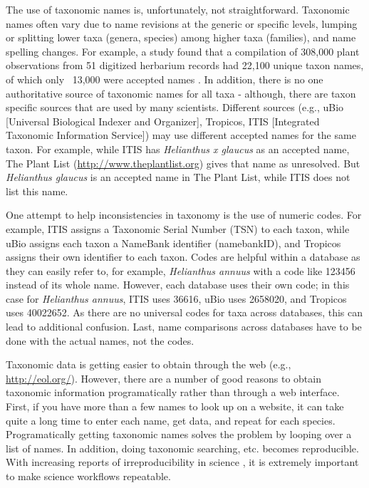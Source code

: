 \begin{sloppypar}
The use of taxonomic names is, unfortunately, not straightforward. 
Taxonomic names often vary due to name revisions at the generic or specific levels, lumping or splitting lower taxa (genera, species) among higher taxa (families), and name spelling changes. 
For example, a study found that a compilation of 308,000 plant observations from 51 digitized herbarium records had 22,100 unique taxon names, of which only ~13,000 were accepted names \citep{weiser2007,boyle2013}. 
In addition, there is no one authoritative source of taxonomic names for all taxa - although, there are taxon specific sources that are used by many scientists. 
Different sources (e.g., uBio [Universal Biological Indexer and Organizer], Tropicos, ITIS [Integrated Taxonomic Information Service]) may use different accepted names for the same taxon. 
For example, while ITIS has \emph{Helianthus x glaucus} as an accepted name, The Plant List (\url{http://www.theplantlist.org}) gives that name as unresolved. But \emph{Helianthus glaucus} is an accepted name in The Plant List, while ITIS does not list this name. 

One attempt to help inconsistencies in taxonomy is the use of numeric codes. 
For example, ITIS assigns a Taxonomic Serial Number (TSN) to each taxon, while uBio assigns each taxon a NameBank identifier (namebankID), and Tropicos assigns their own identifier to each taxon. 
Codes are helpful within a database as they can easily refer to, for example, \emph{Helianthus annuus} with a code like 123456 instead of its whole name. 
However, each database uses their own code; in this case for \emph{Helianthus annuus}, ITIS uses 36616, uBio uses 2658020, and Tropicos uses 40022652. 
As there are no universal codes for taxa across databases, this can lead to additional confusion. 
Last, name comparisons across databases have to be done with the actual names, not the codes. 

Taxonomic data is getting easier to obtain through the web (e.g., \url{http://eol.org/}). 
However, there are a number of good reasons to obtain taxonomic information programatically rather than through a web interface. 
First, if you have more than a few names to look up on a website, it can take quite a long time to enter each name, get data, and repeat for each species. 
Programatically getting taxonomic names solves the problem by looping over a list of names. In addition, doing taxonomic searching, etc. becomes reproducible. 
With increasing reports of irreproducibility in science \citep{stodden2010,zimmer2012}, it is extremely important to make science workflows repeatable.


\end{sloppypar}
